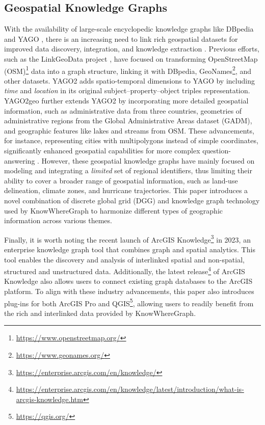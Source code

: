 \subsection{Geospatial Knowledge Graphs}
\label{ssec:gkg}
With the availability of large-scale encyclopedic knowledge graphs like DBpedia \citep{auer2007dbpedia} and YAGO \citep{suchanek2007yago}, there is an increasing need to link rich geospatial datasets for improved data discovery, integration, and knowledge extraction \citep{mai2022symbolic,regalia2018gnis,qi2023evkg}. Previous efforts, such as the LinkGeoData project \citep{auer2009linkedgeodata,stadler2012linkedgeodata}, have focused on transforming OpenStreetMap (OSM)\footnote{\url{https://www.openstreetmap.org/}} data into a graph structure, linking it with DBpedia, GeoNames\footnote{\url{https://www.geonames.org/}}, and other datasets. YAGO2 \citep{hoffart2013yago2} adds spatio-temporal dimensions to YAGO by including \emph{time} and \emph{location} in its original subject–property–object triples representation. YAGO2geo \citep{karalis2019extending} further extends YAGO2 by incorporating more detailed geospatial information, such as administrative data from three countries, geometries of administrative regions from the Global Administrative Areas dataset (GADM), and geographic features like lakes and streams from OSM. These advancements, for instance, representing cities with multipolygons instead of simple coordinates, significantly enhanced geospatial capabilities for more complex question-answering \citep{mai2021geographic}. However, these geospatial knowledge graphs have mainly focused on modeling and integrating a \textit{limited} set of regional identifiers, thus limiting their ability to cover a broader range of geospatial information, such as land-use delineation, climate zones, and hurricane trajectories. This paper introduces a novel combination of discrete global grid (DGG) and knowledge graph technology used by KnowWhereGraph to harmonize different types of geographic information across various themes.

Finally, it is worth noting the recent launch of ArcGIS Knowledge\footnote{\url{https://enterprise.arcgis.com/en/knowledge/}} in 2023, an enterprise knowledge graph tool that combines graph and spatial analytics. This tool enables the discovery and analysis of interlinked spatial and non-spatial, structured and unstructured data. Additionally, the latest release\footnote{\url{https://enterprise.arcgis.com/en/knowledge/latest/introduction/what-is-arcgis-knowledge.htm}} of ArcGIS Knowledge also allows users to connect existing graph databases to the ArcGIS platform. To align with these industry advancements, this paper also introduces plug-ins for both ArcGIS Pro and QGIS\footnote{\url{https://qgis.org/}}, allowing users to readily benefit from the rich and interlinked data provided by KnowWhereGraph. 

